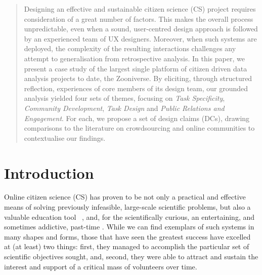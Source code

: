 \documentclass{sigchi}
\begin{document}
\maketitle
\begin{spacing}{0.97}

\begin{abstract}    
Designing an effective and sustainable citizen science (CS) project requires consideration of a great number of factors. This makes the overall process unpredictable, even when a sound, user-centred design approach is followed by an experienced team of UX designers. Moreover, when such systems are deployed, the complexity of the resulting interactions challenges any attempt to generalisation from retrospective analysis. In this paper, we present a case study of the largest single platform of citizen driven data analysis projects to date, the Zooniverse. By eliciting, through structured reflection, experiences of core members of its design team, our grounded analysis yielded four sets of themes, focusing on \emph{Task Specificity}, \emph{Community Development}, \emph{Task Design} and \emph{Public Relations and Engagement}. For each, we propose a set of design claims (DCs), drawing comparisons to the literature on crowdsourcing and online communities to contextualise our findings.
\end{abstract}



\section{Introduction}
\label{sec:introduction}

Online citizen science (CS) has proven to be not only a practical and effective means of solving previously infeasible, large-scale scientific problems, but also a valuable education tool ~\cite{silvertown2009new}, and, for the scientifically curious, an entertaining, and sometimes addictive, past-time \cite{raddick2010galaxy}. While we can find exemplars of such systems in many shapes and forms, those that have seen the greatest success have excelled at (at least) two things: first, they managed to accomplish the particular set of scientific objectives sought, and, second, they were able to attract and sustain the interest and support of a critical mass of volunteers over time. 


\end{spacing}
\end{document}
